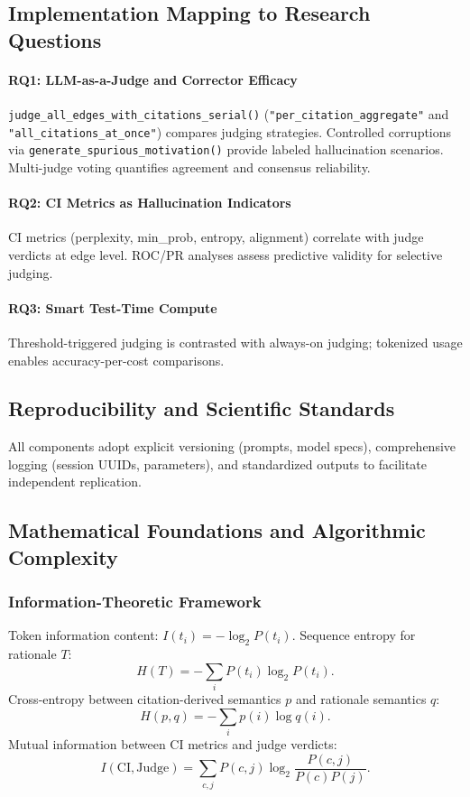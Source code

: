 \subsection{Implementation Mapping to Research Questions}

\paragraph{RQ1: LLM-as-a-Judge and Corrector Efficacy}
\texttt{judge\_all\_edges\_with\_citations\_serial()} (\texttt{"per\_citation\_aggregate"} and \texttt{"all\_citations\_at\_once"}) compares judging strategies. Controlled corruptions via \texttt{generate\_spurious\_motivation()} provide labeled hallucination scenarios. Multi-judge voting quantifies agreement and consensus reliability.

\paragraph{RQ2: CI Metrics as Hallucination Indicators}
CI metrics (perplexity, min\_prob, entropy, alignment) correlate with judge verdicts at edge level. ROC/PR analyses assess predictive validity for selective judging.

\paragraph{RQ3: Smart Test-Time Compute}
Threshold-triggered judging is contrasted with always-on judging; tokenized usage enables accuracy-per-cost comparisons.

\subsection{Reproducibility and Scientific Standards}

All components adopt explicit versioning (prompts, model specs), comprehensive logging (session UUIDs, parameters), and standardized outputs to facilitate independent replication.

\subsection{Mathematical Foundations and Algorithmic Complexity}

\subsubsection{Information-Theoretic Framework}
Token information content: \(I(t_i)=-\log_2 P(t_i)\). Sequence entropy for rationale \(T\):
\[
H(T) = -\sum_{i} P(t_i)\log_2 P(t_i).
\]
Cross-entropy between citation-derived semantics \(p\) and rationale semantics \(q\):
\[
H(p,q) = -\sum_i p(i)\log q(i).
\]
Mutual information between CI metrics and judge verdicts:
\[
I(\text{CI},\text{Judge}) = \sum_{c,j} P(c,j)\log_2\!\frac{P(c,j)}{P(c)P(j)}.
\]

